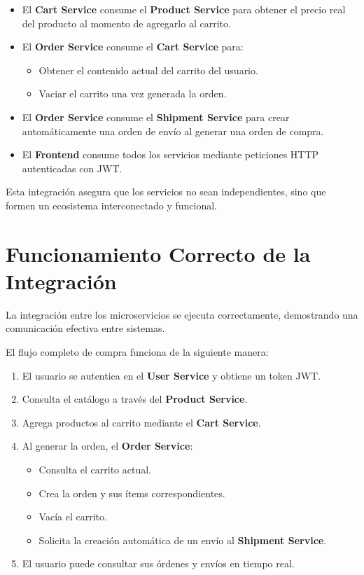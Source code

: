 \documentclass[11pt,a4paper]{article}
\begin{document}
\begin{itemize}
    \item El \textbf{Cart Service} consume el \textbf{Product Service} para obtener el precio real del producto al momento de agregarlo al carrito.
    
    \item El \textbf{Order Service} consume el \textbf{Cart Service} para:
    \begin{itemize}
        \item Obtener el contenido actual del carrito del usuario.
        \item Vaciar el carrito una vez generada la orden.
    \end{itemize}
    
    \item El \textbf{Order Service} consume el \textbf{Shipment Service} para crear automáticamente una orden de envío al generar una orden de compra.
    
    \item El \textbf{Frontend} consume todos los servicios mediante peticiones HTTP autenticadas con JWT.
\end{itemize}

Esta integración asegura que los servicios no sean independientes, sino que formen un ecosistema interconectado y funcional.

\section{Funcionamiento Correcto de la Integración}

La integración entre los microservicios se ejecuta correctamente, demostrando una comunicación efectiva entre sistemas. 

El flujo completo de compra funciona de la siguiente manera:

\begin{enumerate}
    \item El usuario se autentica en el \textbf{User Service} y obtiene un token JWT.
    \item Consulta el catálogo a través del \textbf{Product Service}.
    \item Agrega productos al carrito mediante el \textbf{Cart Service}.
    \item Al generar la orden, el \textbf{Order Service}:
    \begin{itemize}
        \item Consulta el carrito actual.
        \item Crea la orden y sus ítems correspondientes.
        \item Vacía el carrito.
        \item Solicita la creación automática de un envío al \textbf{Shipment Service}.
    \end{itemize}
    \item El usuario puede consultar sus órdenes y envíos en tiempo real.
\end{enumerate}
\end{document}

